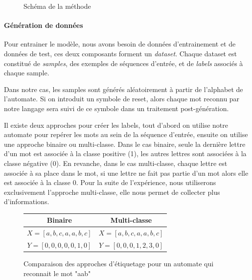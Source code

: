 \documentclass{article}
\begin{document}
\begin{figure}[ht]
    \centering
    \caption{Schéma de la méthode}
\end{figure}

\paragraph{Génération de données} Pour entrainer le modèle, nous avons besoin de données d'entrainement et de données 
de test, ces deux composants forment un \textit{dataset}. Chaque dataset est constitué de \textit{samples}, des exemples de
séquences d'entrée, et de \textit{labels} associés à chaque sample.
\par Dans notre cas, les samples sont générés aléatoirement
à partir de l'alphabet de l'automate. Si on introduit un symbole de reset, alors chaque mot reconnu par notre langage sera 
suivi de ce symbole dans un traitement post-génération.
\par Il existe deux approches pour créer les labels, tout d'abord on utilise notre automate pour repérer les mots au sein 
de la séquence d'entrée, ensuite on utilise une approche binaire ou multi-classe. Dans le cas binaire,
seule la dernière lettre d'un mot est associée à la classe positive (1), les autres lettres sont associées à la classe 
négative (0). En revanche, dans le cas multi-classe, chaque lettre est associée à sa place dans le mot, si une lettre ne fait
pas partie d'un mot alors elle est associée à la classe 0. Pour la suite de l'expérience, nous utiliserons exclusivement
l'approche multi-classe, elle nous permet de collecter plus d'informations.

\begin{figure}[ht]
    \centering
    \begin{tabular}{c|c}
        \textbf{Binaire} & \textbf{Multi-classe} \\
        \hline
        $X = [a,b,c,a,a,b,c]$ & $X = [a,b,c,a,a,b,c]$ \\
        $Y = [0,0,0,0,0,1,0]$ & $Y = [0,0,0,1,2,3,0]$ \\
        
    \end{tabular}
    \caption{Comparaison des approches d'étiquetage pour un automate qui reconnait le mot "aab"}
\end{figure}
\end{document}
